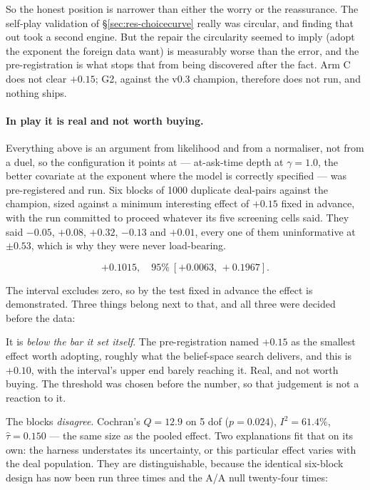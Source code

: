 \documentclass[11pt,letterpaper]{article}
\begin{document}
So the honest position is narrower than either the worry or the reassurance.
The self-play validation of \S\ref{sec:res-choicecurve} really was circular,
and finding that out took a second engine. But the repair the circularity
seemed to imply (adopt the exponent the foreign data want) is measurably
worse than the error, and the pre-registration is what stops that from being
discovered after the fact. Arm C does not clear $+0.15$; G2, against the v0.3
champion, therefore does not run, and nothing ships.

\paragraph{In play it is real and not worth buying.}
\label{sec:res-atask} Everything above is an
argument from likelihood and from a normaliser, not from a duel, so the
configuration it points at --- at-ask-time depth at $\gamma = 1.0$, the better
covariate at the exponent where the model is correctly specified --- was
pre-registered and run. Six blocks of 1000 duplicate deal-pairs against the
champion, sized against a minimum interesting effect of $+0.15$ fixed in
advance, with the run committed to proceed whatever its five screening cells
said. They said $-0.05$, $+0.08$, $+0.32$, $-0.13$ and $+0.01$, every one of
them uninformative at $\pm 0.53$, which is why they were never load-bearing.

\[
  +0.1015, \quad 95\%\ [+0.0063,\, +0.1967].
\]

The interval excludes zero, so by the test fixed in advance the effect is
demonstrated. Three things belong next to that, and all three were decided
before the data:

It is \emph{below the bar it set itself}. The pre-registration named $+0.15$ as
the smallest effect worth adopting, roughly what the belief-space search
delivers, and this is $+0.10$, with the interval's upper end barely reaching
it. Real, and not worth buying. The threshold was chosen before the number, so
that judgement is not a reaction to it.

The blocks \emph{disagree}. Cochran's $Q = 12.9$ on 5 dof ($p = 0.024$),
$I^2 = 61.4\%$, $\hat\tau = 0.150$ --- the same size as the pooled effect. Two
explanations fit that on its own: the harness understates its uncertainty, or
this particular effect varies with the deal population. They are distinguishable,
because the identical six-block design has now been run three times and the A/A
null twenty-four times:
\end{document}
